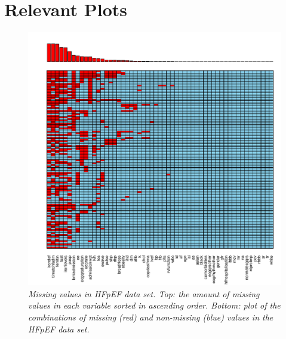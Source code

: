 \documentclass[../thesis.tex]{subfiles}
\begin{document}
\newpage



\newpage



\newpage



\newpage



\newpage



\newpage



\newpage

\section{Relevant Plots}
\label{sec:rel_plots}

\begin{figure}[h!]
    \centering
    \hspace*{-1cm}\includegraphics[width=1.1\textwidth]{doc/thesis/images/HFpEF_miss_dist.pdf}
    \caption[Missing values in HFpEF data set]{\textit{Missing values in HFpEF data set. Top:  the amount of missing values in each variable sorted in ascending order. Bottom: plot of the combinations of missing (red) and non-missing (blue) values in the HFpEF data set.}}
    \label{fig:HFpEF_missing}
\end{figure}
\end{document}
